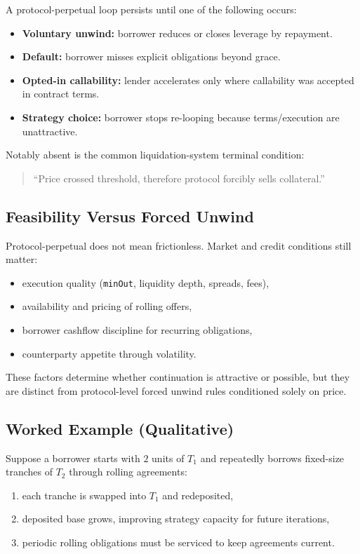 \documentclass[version=preprint]{iacrcc}
\begin{document}
A protocol-perpetual loop persists until one of the following occurs:
\begin{itemize}
  \item \textbf{Voluntary unwind:} borrower reduces or closes leverage by repayment.
  \item \textbf{Default:} borrower misses explicit obligations beyond grace.
  \item \textbf{Opted-in callability:} lender accelerates only where callability was accepted in contract terms.
  \item \textbf{Strategy choice:} borrower stops re-looping because terms/execution are unattractive.
\end{itemize}

Notably absent is the common liquidation-system terminal condition:
\begin{quote}
``Price crossed threshold, therefore protocol forcibly sells collateral.''
\end{quote}

\subsection{Feasibility Versus Forced Unwind}

Protocol-perpetual does not mean frictionless. Market and credit conditions still matter:
\begin{itemize}
  \item execution quality (\texttt{minOut}, liquidity depth, spreads, fees),
  \item availability and pricing of rolling offers,
  \item borrower cashflow discipline for recurring obligations,
  \item counterparty appetite through volatility.
\end{itemize}

These factors determine whether continuation is attractive or possible, but they are distinct from protocol-level forced unwind rules conditioned solely on price.

\subsection{Worked Example (Qualitative)}

Suppose a borrower starts with $2$ units of $T_1$ and repeatedly borrows fixed-size tranches of $T_2$ through rolling agreements:
\begin{enumerate}
  \item each tranche is swapped into $T_1$ and redeposited,
  \item deposited base grows, improving strategy capacity for future iterations,
  \item periodic rolling obligations must be serviced to keep agreements current.
\end{enumerate}
\end{document}
